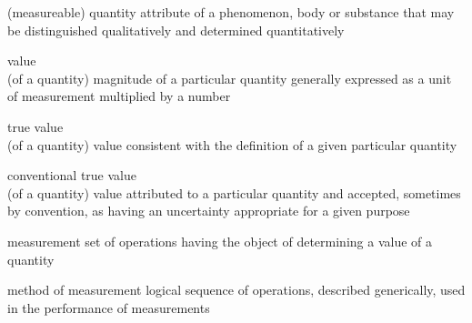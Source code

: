 \documentclass[avery5371,grid]{flashcards}
\begin{document}


\begin{flashcard}[Definition]{(measureable) quantity}
\vspace{\fill}
    attribute of a phenomenon, body or substance that may be distinguished qualitatively and determined quantitatively
\vspace{\fill}
\end{flashcard}

\begin{flashcard}[Definition]{value \\ (of a quantity)}
\vspace{\fill}
    magnitude of a particular quantity generally expressed as a unit of measurement multiplied by a number
\vspace{\fill}
\end{flashcard}

\begin{flashcard}[Definition]{true value \\ (of a quantity)}
\vspace{\fill}
    value consistent with the definition of a given particular quantity
\vspace{\fill}
\end{flashcard}

\begin{flashcard}[Definition]{conventional true value \\ (of a quantity)}
\vspace{\fill}
    value attributed to a particular quantity and accepted, sometimes by convention, as having an uncertainty appropriate for a given purpose
\vspace{\fill}
\end{flashcard}

\begin{flashcard}[Definition]{measurement}
\vspace{\fill}
    set of operations having the object of determining a value of a quantity
\vspace{\fill}
\end{flashcard}

\begin{flashcard}[Definition]{method of measurement}
\vspace{\fill}
    logical sequence of operations, described generically, used in the performance of measurements
\vspace{\fill}
\end{flashcard}
\end{document}
